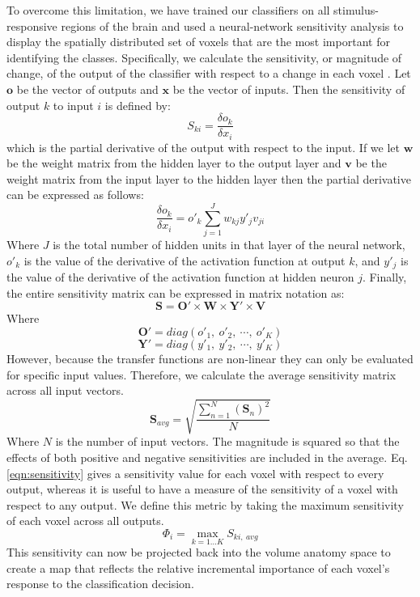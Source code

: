 \documentclass[review,1p,authoryear]{elsarticle}
\begin{document}
To overcome this limitation, we have trained our classifiers on all stimulus-responsive regions of the brain and used a neural-network sensitivity analysis to display the spatially distributed set of voxels that are the most important for identifying the classes.
Specifically, we calculate the sensitivity, or magnitude of change, of the output of the classifier with respect to a change in each voxel
 \citep{Zurada1994}.
Let $\mathbf{o}$ be the vector of outputs and $\mathbf{x}$ be the vector of inputs.
Then the sensitivity of output $k$ to input $i$ is defined by:
\begin{equation}
S_{ki} = \frac{\delta o_{k}}{\delta x_{i}}
\end{equation}
which is the partial derivative of the output with respect to the input.
If we let $\mathbf{w}$ be the weight matrix from the hidden layer to the output layer and $\mathbf{v}$ be the weight matrix from the input layer to the hidden layer then the partial derivative can be expressed as follows:
\begin{equation}
\frac{\delta o_{k}}{\delta x_{i}} = o'_{k} \sum^{J}_{j=1}{w_{kj}y'_{j}v_{ji}}
\end{equation}
Where $J$ is the total number of hidden units in that layer of the neural network,  $o'_{k}$ is the value of the derivative of the activation function at output $k$, and $y'_{j}$ is the value of the derivative of the activation function at hidden neuron $j$.
Finally, the entire sensitivity matrix can be expressed in matrix notation as:
\begin{equation}
\mathbf{S} = \mathbf{O}' \times \mathbf{W} \times \mathbf{Y}' \times \mathbf{V}
\end{equation}
Where
\begin{equation}
\mathbf{O}' = diag(o'_{1},~o'_{2},~\cdots,~o'_{K})
\end{equation}
\begin{equation}
\mathbf{Y}' = diag(y'_{1},~y'_{2},~\cdots,~y'_{K})
\end{equation}
However, because the transfer functions are non-linear they can only be evaluated for specific input values.
Therefore, we calculate the average sensitivity matrix across all input vectors.
\begin{equation}
\mathbf{S}_{avg} = \sqrt{ \frac{ \sum_{n = 1}^{N}{ \left( \mathbf{S}_{n}\right)^{2} } }{N} }
\label{eqn:sensitivity}
\end{equation}
Where $N$ is the number of input vectors.
The magnitude is squared so that the effects of both positive and negative sensitivities are included in the average.
Eq. \ref{eqn:sensitivity} gives a sensitivity value for each voxel with respect to every output, whereas it is useful to have a measure of the sensitivity of a voxel with respect to any output.
We define this metric by taking the maximum sensitivity of each voxel across all outputs.
\begin{equation}
\Phi_{i} = \max_{k=1 \dots K}{S_{ki,~avg}}
\end{equation}
This sensitivity can now be projected back into the volume anatomy space to create a  map that reflects the relative incremental importance of each voxel's response to the classification decision.
\end{document}
